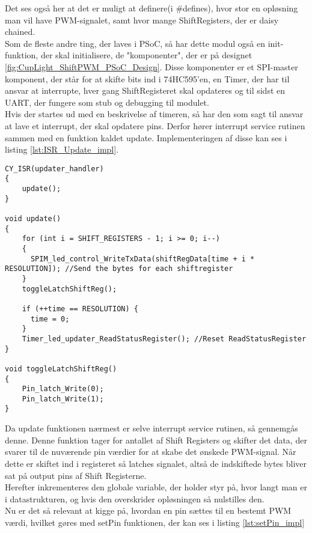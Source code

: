 \documentclass[Softwaredesign/Softwaredesign_main.tex]{subfiles}
\begin{document}
Det ses også her at det er muligt at definere(i \#defines), hvor stor en opløsning man vil have PWM-signalet, samt hvor mange ShiftRegisters, der er daisy chained. 
\\Som de fleste andre ting, der laves i PSoC, så har dette modul også en init-funktion, der skal initialisere, de "komponenter", der er på designet \ref{fig:CupLight_ShiftPWM_PSoC_Design}. Disse komponenter er et SPI-master komponent, der står for at skifte bits ind i 74HC595'en, en Timer, der har til ansvar at interrupte, hver gang ShiftRegisteret skal opdateres og til sidst en UART, der fungere som stub og debugging til modulet.
\\Hvis der startes ud med en beskrivelse af timeren, så har den som sagt til ansvar at lave et interrupt, der skal opdatere pins. Derfor hører interrupt service rutinen sammen med en funktion kaldet update. Implementeringen af disse kan ses i listing \ref{lst:ISR_Update_impl}.
\begin{lstlisting}[caption={ISR \& Update}, label={lst:ISR_Update_impl}, style=customc]
CY_ISR(updater_handler)
{
    update();
}                   

void update()
{
    for (int i = SHIFT_REGISTERS - 1; i >= 0; i--)
    {
      SPIM_led_control_WriteTxData(shiftRegData[time + i * RESOLUTION]); //Send the bytes for each shiftregister
    }
    toggleLatchShiftReg();
    
    if (++time == RESOLUTION) {
      time = 0;
    }
    Timer_led_updater_ReadStatusRegister(); //Reset ReadStatusRegister
}

void toggleLatchShiftReg()
{
    Pin_latch_Write(0);
    Pin_latch_Write(1);
}
\end{lstlisting}

Da update funktionen nærmest er selve interrupt service rutinen, så gennemgås denne. Denne funktion tager for antallet af Shift Registers og skifter det data, der svarer til de nuværende pin værdier for at skabe det ønskede PWM-signal. Når dette er skiftet ind i registeret så latches signalet, altså de indskiftede bytes bliver sat på output pins af Shift Registerne.\\
Herefter inkrementeres den globale variable, der holder styr på, hvor langt man er i datastrukturen, og hvis den overskrider opløsningen så nulstilles den. \\
Nu er det så relevant at kigge på, hvordan en pin sættes til en bestemt PWM værdi, hvilket gøres med setPin funktionen, der kan ses i listing \ref{lst:setPin_impl}
\end{document}

